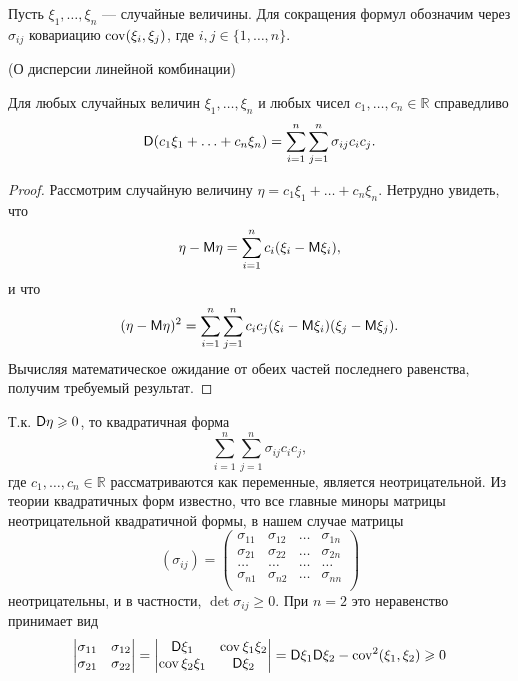 Пусть $\xi_1,\dots, \xi_n$ — случайные величины. Для сокращения формул обозначим через $\sigma_{ij}$ ковариацию $\operatorname{cov}(\xi_i, \xi_j)$, где $i, j \in \{1, \ldots, n\}.$

\begin{lemma}
\label{lemma:19.4}
	(О дисперсии линейной комбинации)

	Для любых случайных величин $\xi_1,\dots , \xi_n$ и любых чисел $c_1,\dots, c_n \in \mathbb{R}$ справедливо
	\begin{equation*}
		\mathsf{D}(c_1 \xi_1+\ldots+c_n \xi_n)=\sum_{i=1}^n\sum_{j=1}^n\sigma_{ij}c_ic_j.
	\end{equation*}
\end{lemma}

\begin{proof}
	Рассмотрим случайную величину $\eta = c_1 \xi_1 +\dots+ c_n \xi_n$.
	Нетрудно увидеть, что
	\begin{equation*}
		\eta-\mathsf{M}\eta=\sum_{i=1}^nc_i(\xi_i-\mathsf{M} \xi_i),
	\end{equation*}
	и что
	\begin{equation*}
		(\eta-\mathsf{M}\eta)^2=\sum_{i=1}^n\sum_{j=1}^nc_ic_j(\xi_i-\mathsf{M} \xi_i)(\xi_j-\mathsf{M} \xi_j).
	\end{equation*}
	Вычисляя математическое ожидание от обеих частей последнего равенства,
	получим требуемый результат.
\end{proof}

\begin{zam}\label{zam:19.5}
	Т.к. $\mathsf{D}\eta \geqslant 0$, то квадратичная форма $$\sum_{i=1}^n\sum_{j=1}^n\sigma_{ij}c_ic_j,$$ где $c_1,\dots, c_n \in \mathbb{R}$ рассматриваются как переменные, является неотрицательной. Из теории квадратичных форм известно, что все главные миноры матрицы неотрицательной квадратичной формы, в нашем случае матрицы
	\begin{equation*}
		(\sigma_{ij})=	
		\begin{pmatrix}
	  		\sigma_{11}& \sigma_{12}& \ldots & \sigma_{1n}\\
	  		\sigma_{21}& \sigma_{22}& \ldots & \sigma_{2n} \\
	  		\ldots & \ldots& \ldots & \ldots \\
	  		\sigma_{n1}& \sigma_{n2}& \ldots & \sigma_{nn}\\
		\end{pmatrix}
	\end{equation*}
	неотрицательны, и в частности, $\det\sigma_{ij} \geqslant 0$. При $n = 2$ это неравенство принимает вид
	\begin{equation*}
		\begin{vmatrix}
			\sigma_{11}& \sigma_{12}\\
		 	\sigma_{21}& \sigma_{22}\\
		\end{vmatrix}
		=
		\begin{vmatrix}
			\mathsf{D} \xi_1 & \operatorname{cov}{\xi_1 \xi_2}\\
			\operatorname{cov}{\xi_2 \xi_1} & \mathsf{D} \xi_2\\
		\end{vmatrix}
		=\mathsf{D} \xi_1 \mathsf{D} \xi_2-\operatorname{cov}^2(\xi_1, \xi_2)\geqslant 0		
	\end{equation*}
\end{zam}

